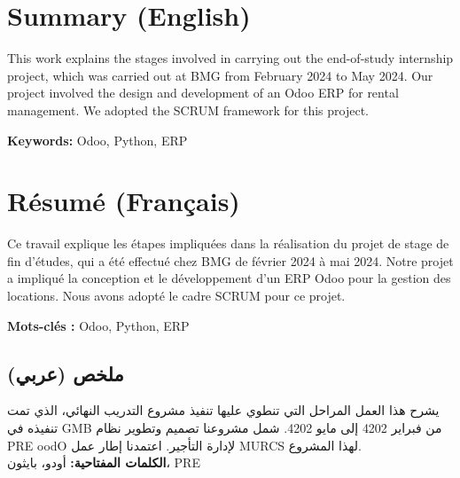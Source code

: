 \thispagestyle{empty}
\section*{Summary (English)}
This work explains the stages involved in carrying out the end-of-study internship project, which was carried out at BMG from February 2024 to May 2024. Our project involved the design and development of an Odoo ERP for rental management. We adopted the SCRUM framework for this project.

\textbf{Keywords:} Odoo, Python, ERP

\section*{Résumé (Français)}
Ce travail explique les étapes impliquées dans la réalisation du projet de stage de fin d'études, qui a été effectué chez BMG de février 2024 à mai 2024. Notre projet a impliqué la conception et le développement d'un ERP Odoo pour la gestion des locations. Nous avons adopté le cadre SCRUM pour ce projet.

\textbf{Mots-clés :} Odoo, Python, ERP

\begin{Arabic}
\section*{ملخص (عربي)}
يشرح هذا العمل المراحل التي تنطوي عليها تنفيذ مشروع التدريب النهائي، الذي تمت تنفيذه في GMB من فبراير 4202 إلى مايو 4202. شمل مشروعنا تصميم وتطوير نظام PRE oodO لإدارة التأجير. اعتمدنا إطار عمل MURCS لهذا المشروع. \\
\textbf{الكلمات المفتاحية:} أودو، بايثون، PRE

\end{Arabic}
